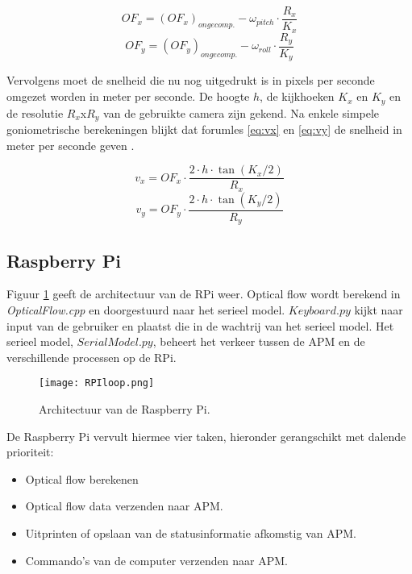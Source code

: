 \begin{equation}
OF_x = (OF_x)_{ongecomp.} - \omega_{pitch} \cdot \frac{R_x}{K_x}
\label{eq:comproll}
\end{equation}
\begin{equation}
OF_y = (OF_y)_{ongecomp.} - \omega_{roll} \cdot \frac{R_y}{K_y}
\label{eq:comppitch}
\end{equation}

\npar Vervolgens moet de snelheid die nu nog uitgedrukt is in pixels per seconde omgezet worden in meter per seconde. De hoogte $h$, de kijkhoeken $K_x$ en $K_y$ en de resolutie $R_x$x$R_y$ van de gebruikte camera zijn gekend. Na enkele simpele goniometrische berekeningen blijkt dat forumles \eqref{eq:vx} en \eqref{eq:vy} de snelheid in meter per seconde geven \cite{thesis:wouter}.

\begin{equation}
v_x = OF_x \cdot \frac{2 \cdot h \cdot \tan(K_x/2)}{R_x}
\label{eq:vx}
\end{equation}
\begin{equation}
v_y = OF_y \cdot \frac{2 \cdot h \cdot \tan(K_y/2)}{R_y}
\label{eq:vy}
\end{equation}

\subsection{Raspberry Pi} \label{sec:softRPi}

Figuur \ref{fig:RPIloop} geeft de architectuur van de RPi weer. Optical flow wordt berekend in \textit{OpticalFlow.cpp} en doorgestuurd naar het serieel model. $Keyboard.py$ kijkt naar input van de gebruiker en plaatst die in de wachtrij van het serieel model. Het serieel model, $SerialModel.py$, beheert het verkeer tussen de APM en de verschillende processen op de RPi.

\begin{figure}[h]
	\centering
	\texttt{[image: RPIloop.png]}
	\caption{Architectuur van de Raspberry Pi.}
	\label{fig:RPIloop}
\end{figure}

\npar De Raspberry Pi vervult hiermee vier taken, hieronder gerangschikt met dalende prioriteit:
\begin{itemize}
\item[1.] Optical flow berekenen
\item[2.] Optical flow data verzenden naar APM.
\item[3.] Uitprinten of opslaan van de statusinformatie afkomstig van APM.
\item[4.] Commando's van de computer verzenden naar APM.
\end{itemize}

